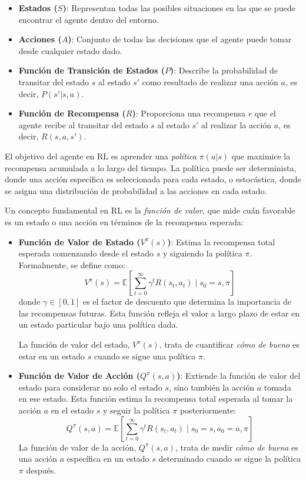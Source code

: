 \documentclass[a4paper,12pt, twoside]{report}
\begin{document}
\begin{itemize}
    \item \textbf{Estados (\(S\))}: Representan todas las posibles situaciones en las que se puede 
    encontrar el agente dentro del entorno.
    \item \textbf{Acciones (\(A\))}: Conjunto de todas las decisiones que el agente puede tomar 
    desde cualquier estado dado.
    \item \textbf{Función de Transición de Estados (\(P\))}: Describe la probabilidad de transitar 
    del estado \(s\) al estado \(s'\) como resultado de realizar una acción \(a\), es decir, \(P(s'|s, a)\).
    \item \textbf{Función de Recompensa (\(R\))}: Proporciona una recompensa \(r\) que el agente 
    recibe al transitar del estado \(s\) al estado \(s'\) al realizar la acción \(a\), es decir, \(R(s, a, s')\).
\end{itemize}

El objetivo del agente en RL es aprender una \textit{política} \(\pi(a|s)\) que maximice la recompensa 
acumulada a lo largo del tiempo. La política puede ser determinista, donde una acción específica es 
seleccionada para cada estado, o estocástica, donde se asigna una distribución de probabilidad a las
acciones en cada estado.

Un concepto fundamental en RL es la \textit{función de valor}, que mide cuán favorable es un estado 
o una acción en términos de la recompensa esperada:

\begin{itemize}
    \item \textbf{Función de Valor de Estado (\(V^{\pi}(s)\))}: Estima la recompensa total esperada 
    comenzando desde el estado \(s\) y siguiendo la política \(\pi\). Formalmente, se define como:
    \[
    V^{\pi}(s) = \mathbb{E}\left[\sum_{t=0}^{\infty} \gamma^t R(s_t, a_t) \mid s_0 = s, \pi\right]
    \]
    donde \(\gamma \in [0, 1]\) es el factor de descuento que determina la importancia de las 
    recompensas futuras. Esta función refleja el valor a largo plazo de estar en un estado particular 
    bajo una política dada.

    La función de valor del estado, \(V^{\pi}(s)\), trata de cuantificar \textit{cómo de bueno} es 
    estar en un estado \(s\) cuando se sigue una política \(\pi\).

    \item \textbf{Función de Valor de Acción (\(Q^{\pi}(s, a)\))}: Extiende la función de valor del 
    estado para considerar no solo el estado \(s\), sino también la acción \(a\) tomada en ese estado. 
    Esta función estima la recompensa total esperada al tomar la acción \(a\) en el estado \(s\) y 
    seguir la política \(\pi\) posteriormente:
    \[
    Q^{\pi}(s, a) = \mathbb{E}\left[\sum_{t=0}^{\infty} \gamma^t R(s_t, a_t) \mid s_0 = s, a_0 = a, \pi\right]
    \]
    La función de valor de la acción, \(Q^{\pi}(s, a)\), trata de medir \textit{cómo de buena} es una 
    acción \(a\) específica en un estado \(s\) determinado cuando se sigue la política \(\pi\) después.
 
\end{itemize}
\end{document}
